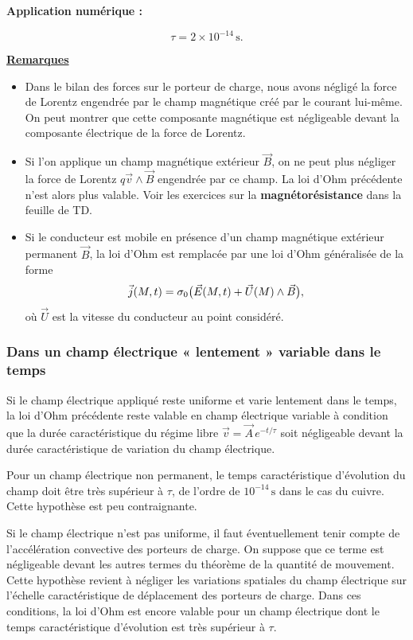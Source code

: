 \documentclass[11pt,a4paper]{article}
\newif\ifinexample
\newcommand{\vv}{\vec v}
\newcommand{\titr}[1]{\par\ifinexample\else\Needspace{4\baselineskip}\fi\textbf{\underline{#1}}\par\nopagebreak[3]}
\newcommand{\stars}[1]{\mathord{\star}\ifnum#1>1\mkern5mu\mathord{\star}\fi\ifnum#1>2\mkern5mu\mathord{\star}\fi\ifnum#1>3\mkern5mu\mathord{\star}\fi\ifnum#1>4\mkern5mu\mathord{\star}\fi\ifnum#1>5\mkern5mu\mathord{\star}\fi}
\newenvironment{result}[1][4]{\begin{cadre}[etoiles={\stars{#1}}]}{\end{cadre}}
\newcommand{\vj}{\vec j}\newcommand{\vE}{\vec E}\newcommand{\vB}{\vec B}
\newcommand{\betoile}[2]{\begin{result}[#1]\[#2\]\end{result}}
\newcommand{\unite}[1]{\,\mathrm{#1}}
\begin{document}
\textbf{Application numérique :}
\betoile{5}{\tau=2\times10^{-14}\unite s.}

\titr{Remarques}
\begin{itemize}
\item Dans le bilan des forces sur le porteur de charge, nous avons négligé la force de Lorentz
engendrée par le champ magnétique créé par le courant lui-même. On peut montrer que cette
composante magnétique est négligeable devant la composante électrique de la force de Lorentz.
\item Si l'on applique un champ magnétique extérieur \(\vB\), on ne peut plus négliger la
force de Lorentz \(q\vv\wedge\vB\) engendrée par ce champ. La loi d'Ohm précédente n'est
alors plus valable. Voir les exercices sur la \textbf{magnétorésistance} dans la feuille de TD.
\item Si le conducteur est mobile en présence d'un champ magnétique extérieur permanent \(\vB\),
la loi d'Ohm est remplacée par une loi d'Ohm généralisée de la forme
\[
 \vj(M,t)=\sigma_0\bigl(\E(M,t)+\vec U(M)\wedge\vB\bigr),
\]
où \(\vec U\) est la vitesse du conducteur au point considéré.
\end{itemize}

\subsubsection{Dans un champ électrique « lentement » variable dans le temps}\label{sec:lent}
Si le champ électrique appliqué reste uniforme et varie lentement dans le temps, la loi d'Ohm
précédente reste valable en champ électrique variable à condition que la durée caractéristique du
régime libre \(\vv=\vec A\,e^{-t/\tau}\) soit négligeable devant la durée caractéristique de
variation du champ électrique.

Pour un champ électrique non permanent, le temps caractéristique d'évolution du champ doit être
très supérieur à \(\tau\), de l'ordre de \(10^{-14}\unite s\) dans le cas du cuivre. Cette
hypothèse est peu contraignante.

Si le champ électrique n'est pas uniforme, il faut éventuellement tenir compte de l'accélération
convective des porteurs de charge. On suppose que ce terme est négligeable devant les autres
termes du théorème de la quantité de mouvement. Cette hypothèse revient à négliger les variations
spatiales du champ électrique sur l'échelle caractéristique de déplacement des porteurs de
charge. Dans ces conditions, la loi d'Ohm est encore valable pour un champ électrique dont le
temps caractéristique d'évolution est très supérieur à \(\tau\).
\end{document}
